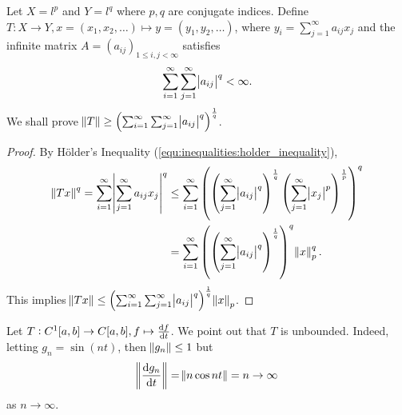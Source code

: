 \begin{example}
Let $X = l^p$ and $Y = l^q$ where $p, q$ are conjugate indices. 
Define $T: X \to Y, x = \left(x_1, x_2, \ldots \right) \mapsto 
y = \left(y_1, y_2, \ldots \right)$, where $y_i = \sum_{j=1}^{\infty} 
a_{ij} x_j$ and the infinite matrix $A = (a_{ij})_{1 \le i, j < \infty}$ 
satisfies 
\begin{equation*}
    \sum_{i=1}^{\infty} \sum_{j=1}^{\infty} \abs{a_{ij}}^q < \infty.
\end{equation*}
We shall prove $\norm{T} \ge \left( \sum_{i=1}^{\infty} \sum_{j=1}^{\infty} 
\abs{a_{ij}}^q \right) ^\frac{1}{q}$. 
\end{example}
\begin{proof}
By Hölder's Inequality (\ref{equ:inequalities:holder_inequality}), 
\begin{equation*}
    \begin{aligned}
        \norm{Tx}^q = \sum_{i=1}^{\infty} 
            \abs{\sum_{j=1}^{\infty} a_{ij} x_j}^q 
        &\le \sum_{i=1}^{\infty} \left( 
                \left( \sum_{j=1}^{\infty} \abs{a_{ij}}^q \right)^\frac{1}{q}
                \left( \sum_{j=1}^{\infty} \abs{x_j}^p \right)^\frac{1}{p}
            \right) ^q \\ 
        &= \sum_{i=1}^{\infty} \left( 
            \left( \sum_{j=1}^{\infty} \abs{a_{ij}}^q \right)^\frac{1}{q}
        \right) ^q \norm{x}_p ^q.
    \end{aligned}
\end{equation*}
This implies $\norm{Tx} \le \left( \sum_{i=1}^{\infty} \sum_{j=1}^{\infty} 
\abs{a_{ij}}^q \right) ^\frac{1}{q} \norm{x}_p$.
\end{proof}

\begin{example}
Let $T: C^1[a, b] \to C[a, b], f \mapsto \frac{\mathop{}\!\mathrm{d} f}{\mathop{}\!\mathrm{d} t}$. 
We point out that $T$ is unbounded. 
Indeed, letting $g_n = \sin(nt)$, then $\norm{g_n} \le 1$ but 
\begin{equation*}
    \norm{\frac{\mathop{}\!\mathrm{d} g_n}{\mathop{}\!\mathrm{d} t}} = \norm{n \cos nt} = n \to \infty 
\end{equation*}
as $n \to \infty$. 
\end{example}

